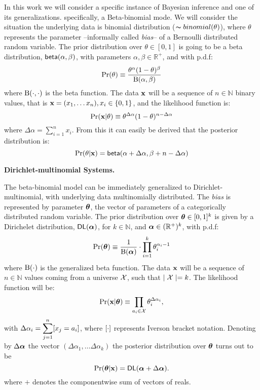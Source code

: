\documentclass{article}
\begin{document}
In this work we will consider a specific instance of Bayesian inference and one of its generalizations.
specifically, a Beta-binomial mode. We will consider the situation the underlying data is binomial distribution ($\thicksim binomial(\theta)$), where $\theta$ represents
the parameter --informally called \emph{bias}-- of a Bernoulli
distributed random variable. The
prior distribution over $\theta\in [0,1]$ is going to be a beta
distribution, $\mathsf{beta}(\alpha, \beta)$, with parameters
$\alpha,\beta\in\mathbb{R}^{+}$, and with p.d.f:
\[
  \Pr(\theta)\equiv \frac{\theta^{\alpha} (1- \theta)^{\beta}}{\textup{B}(\alpha,\beta)}
\]
where $\textup{B}(\cdot,\cdot)$ is the beta function.
The data $\textbf{x}$ will be a sequence of $n\in\mathbb{N}$ binary values, that is $\textbf{x}= (x_1,\dots x_n), x_i\in\{0,1\}$, and the likelihood function is:
\[
  \Pr(\textbf{x} | \theta)\equiv \theta^{\Delta \alpha}(1-\theta)^{n - \Delta \alpha}
\]
where $\Delta \alpha = \displaystyle\sum_{i=1}^{n}x_i$.
From this it can easily be derived that the posterior distribution is:
\[
  \Pr(\theta|\textbf{x})=\mathsf{beta}(\alpha + \Delta \alpha,\beta + n - \Delta \alpha)
\]


\noindent \textbf{Dirichlet-multinomial Systems.}

The beta-binomial model can be immediately generalized to Dirichlet-multinomial, with underlying data multinomially distributed. The \emph{bias} is represented by parameter $\boldsymbol{\theta}$, the vector of parameters of a categorically distributed random variable. The prior distribution over $\boldsymbol{\theta}\in [0,1]^{k}$
is given by a Dirichelet distribution, $\mathsf{DL}(\boldsymbol{\alpha})$, for $k\in\mathbb{N}$,
and $\boldsymbol{\alpha}\in(\mathbb{R}^{+})^{k}$, with p.d.f:
\[
  \Pr(\boldsymbol{\theta})\equiv\frac{1}{\boldsymbol{\textup{B}}(\boldsymbol{\alpha})}\cdot \displaystyle\prod_{i=1}^{k}{\theta_i^{\alpha_i-1}}
\]
where $\boldsymbol{\textup{B}}(\cdot)$ is the generalized beta function.
The data $\textbf{x}$ will be a sequence of $n\in\mathbb{N}$ values
coming from a universe $\mathcal{X}$, such that $\mid\mathcal{X} \mid=k$.
The likelihood function will be:
\[
  \Pr(\textbf{x}|\boldsymbol{\theta})\equiv \displaystyle\prod_{a_i\in\mathcal{X}}\theta_{i}^{\Delta \alpha_i},
\]
with $\Delta \alpha_i=\displaystyle\sum_{j=1}^{n}[x_j=a_i]$, where $[\cdot]$ represents Iverson bracket notation.
Denoting by $\Delta\boldsymbol{\alpha}$ the vector $(\Delta\alpha_1,\dots \Delta\alpha_k)$ the posterior distribution over $\boldsymbol{\theta}$ turns out to be
\[
  \Pr(\boldsymbol{\theta}|\textbf{x})=\mathsf{DL}(\boldsymbol{\alpha}+\Delta \boldsymbol{\alpha}). 
\]
where $+$ denotes the componentwise sum of vectors of reals. 
\end{document}
